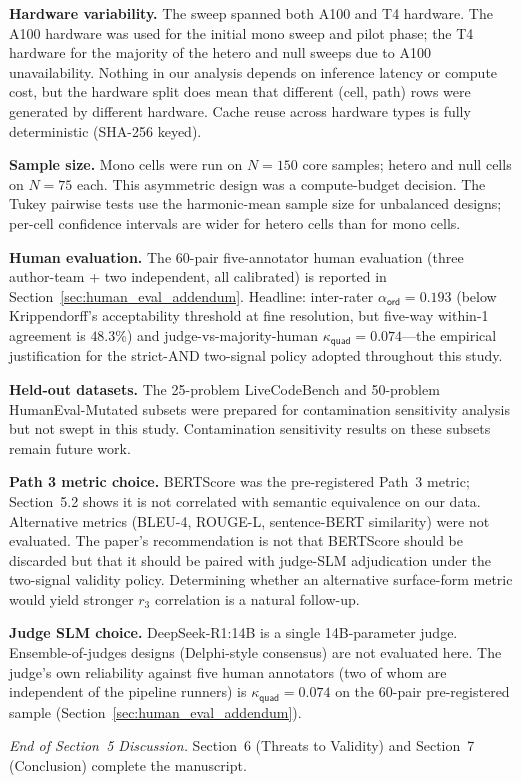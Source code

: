 \textbf{Hardware variability.} The sweep spanned both A100 and T4 hardware. The A100 hardware was used for the initial mono sweep and pilot phase; the T4 hardware for the majority of the hetero and null sweeps due to A100 unavailability. Nothing in our analysis depends on inference latency or compute cost, but the hardware split does mean that different (cell, path) rows were generated by different hardware. Cache reuse across hardware types is fully deterministic (SHA-256 keyed).

\textbf{Sample size.} Mono cells were run on $N = 150$ core samples; hetero and null cells on $N = 75$ each. This asymmetric design was a compute-budget decision. The Tukey pairwise tests use the harmonic-mean sample size for unbalanced designs; per-cell confidence intervals are wider for hetero cells than for mono cells.

\textbf{Human evaluation.} The 60-pair five-annotator human evaluation (three author-team + two independent, all calibrated) is reported in Section~\ref{sec:human_eval_addendum}. Headline: inter-rater $\alpha_{\textsf{ord}} = 0.193$ (below Krippendorff's acceptability threshold at fine resolution, but five-way within-1 agreement is $48.3\%$) and judge-vs-majority-human $\kappa_{\textsf{quad}} = 0.074$---the empirical justification for the strict-AND two-signal policy adopted throughout this study.

\textbf{Held-out datasets.} The 25-problem LiveCodeBench and 50-problem HumanEval-Mutated subsets were prepared for contamination sensitivity analysis but not swept in this study. Contamination sensitivity results on these subsets remain future work.

\textbf{Path 3 metric choice.} BERTScore was the pre-registered Path~3 metric; Section~5.2 shows it is not correlated with semantic equivalence on our data. Alternative metrics (BLEU-4, ROUGE-L, sentence-BERT similarity) were not evaluated. The paper's recommendation is not that BERTScore should be discarded but that it should be paired with judge-SLM adjudication under the two-signal validity policy. Determining whether an alternative surface-form metric would yield stronger $r_3$ correlation is a natural follow-up.

\textbf{Judge SLM choice.} DeepSeek-R1:14B is a single 14B-parameter judge. Ensemble-of-judges designs (Delphi-style consensus) are not evaluated here. The judge's own reliability against five human annotators (two of whom are independent of the pipeline runners) is $\kappa_{\textsf{quad}} = 0.074$ on the 60-pair pre-registered sample (Section~\ref{sec:human_eval_addendum}).


\emph{End of Section~5 Discussion.} Section~6 (Threats to Validity) and Section~7 (Conclusion) complete the manuscript.
